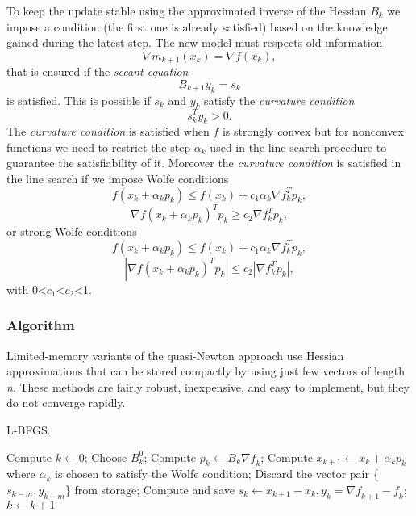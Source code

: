 To keep the update stable using the approximated inverse of the Hessian $B_{k}$ we impose a condition (the first one is already satisfied) based on the knowledge gained during the latest step. The new model must respects old information 
\begin{equation}
\nabla m_{k+1}(x_{k})=\nabla f(x_{k}),
\end{equation}
that is ensured if the \textit{secant equation}
\begin{equation}
B_{k+1}y_{k}=s_{k}
\end{equation}
is satisfied. This is possible if $s_{k}$ and $y_{k}$ satisfy the \textit{curvature condition} 
\begin{equation}
s_{k}^T y_{k}>0.
\end{equation}
The \textit{curvature condition} is satisfied when $f$ is strongly convex but for nonconvex functions we need to restrict the step $\alpha_{k}$ used in the line search procedure to guarantee the satisfiability of it.
Moreover the \textit{curvature condition} is satisfied in the line search if we impose Wolfe conditions
\begin{equation}
f(x_k + \alpha_kp_k ) \leq f (x_k ) + c_1 \alpha_k \nabla f_k^T p_k,
\end{equation}
\begin{equation}
\nabla f(x_k + \alpha_{k} p_k )^T p_k \geq c_2 \nabla f_k^T p_k ,
\end{equation}
or strong Wolfe conditions
\begin{equation}
f(x_k + \alpha_kp_k ) \leq f (x_k ) + c_1 \alpha_k \nabla f_k^T p_k,
\end{equation}
\begin{equation}
|\nabla f(x_k + \alpha_{k} p_k )^T p_k| \leq c_2 |\nabla f_k^T p_k| ,
\end{equation}
with 0<$c_1$<$c_2$<1.

\subsubsection{Algorithm}
Limited-memory variants  of  the  quasi-Newton  approach use  Hessian  approximations  that  can  be stored compactly by using just few vectors of length \textit{n}. These methods are fairly robust, inexpensive, and easy to implement, but they do not converge rapidly.

\begin{algorithm}[H]
	\caption{L-BFGS.}
	\label{alg:LBFGS}
	\begin{algorithmic}[4]
		\State Compute $k \gets 0$;
		\Repeat
		\State Choose \textbf{$B^0_k$};
		\State Compute $p_k \gets B_k\nabla \textit{f}_k$;
		\State Compute $x_{k+1} \gets x_{k}+ \alpha_{k}p_{k}$ where $\alpha_{k}$ is chosen to satisfy the Wolfe condition;
		\State Discard the vector pair \{$s_{k-m},y_{k-m}$\} from storage;
		\EndIf
		\State Compute and save $s_k \gets x_{k+1}-x_{k}, y_k=\nabla \textit{f}_{k+1}-\textit{f}_k$;
		\State $k \gets k+1$
		\EndProcedure 
	\end{algorithmic}
\end{algorithm}

